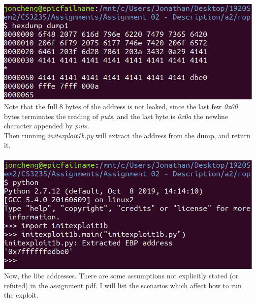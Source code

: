 \documentclass[12pt]{article}
\begin{document}
\includegraphics[scale=0.7]{./a2/rop/dump1.PNG}\\

Note that the full 8 bytes of the address is not leaked, since the last few \emph{0x00} bytes terminates the reading of \emph{puts}, and the last byte is \emph{0x0a} the newline character appended by \emph{puts}.\\

Then running \emph{initexploit1b.py} will extract the address from the dump, and return it.\\\\

\includegraphics[scale=0.7]{./a2/rop/dump1_ext.PNG}\\

Now, the libc addresses. There are some assumptions not explicitly stated (or refuted) in the assignment pdf. I will list the scenarios which affect how to run the exploit.\\

\newpage
\end{document}
